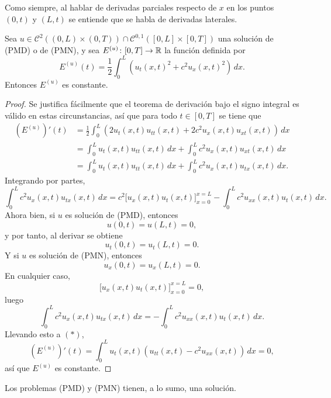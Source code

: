 \documentclass[a4paper, 12pt, extrafontsizes]{memoir}
\begin{document}
Como siempre, al hablar de derivadas parciales respecto de $x$ en los puntos $(0,t)$ y $(L,t)$ se entiende que se habla de derivadas laterales.

\begin{proposition}
    Sea $u \in \mathcal{C}^2((0,L) \times (0,T)) \cap \mathcal{C}^{0,1}([0,L] \times [0,T])$ una solución de \textup{(PMD)} o de \textup{(PMN)}, y sea $E^{(u)} \colon [0,T] \to \mathbb R$ la función definida por
    \[E^{(u)}(t) = \frac{1}{2}\int_0^L(u_t(x,t)^2+c^2u_x(x,t)^2) \, dx.\]
    Entonces $E^{(u)}$ es constante.
\end{proposition}

\begin{proof}
    Se justifica fácilmente que el teorema de derivación bajo el signo integral es válido en estas circunstancias, así que para todo $t \in [0,T]$ se tiene que
    \begin{align*}
        (E^{(u)})'(t) &= \frac{1}{2}\int_0^L(2u_t(x,t)u_{tt}(x,t)+2c^2u_x(x,t)u_{xt}(x,t)) \, dx \\
        &= \int_0^Lu_t(x,t)u_{tt}(x,t)\, dx +\int_0^Lc^2u_x(x,t)u_{xt}(x,t) \, dx \\
        &= \int_0^Lu_t(x,t)u_{tt}(x,t)\, dx +\int_0^Lc^2u_x(x,t)u_{tx}(x,t) \, dx. \tag{$\ast$}
    \end{align*}
    Integrando por partes,
    \[\int_0^L c^2u_x(x,t)u_{tx}(x,t) \, dx = c^2\biggl[u_x(x,t)u_t(x,t)\biggr]_{x=0}^{x=L} -\int_0^Lc^2u_{xx}(x,t)u_t(x,t) \, dx.\]
    Ahora bien, si $u$ es solución de (PMD), entonces
    \[u(0,t) = u(L,t) = 0,\]
    y por tanto, al derivar se obtiene
    \[u_t(0,t) = u_t(L,t) = 0.\]
    Y si $u$ es solución de (PMN), entonces
    \[u_x(0,t) = u_x(L,t) = 0.\]
    En cualquier caso,
    \[\biggl[u_x(x,t)u_t(x,t)\biggr]_{x=0}^{x=L}  = 0,\]
    luego 
    \[\int_0^L c^2u_x(x,t)u_{tx}(x,t) \, dx = -\int_0^Lc^2u_{xx}(x,t)u_t(x,t) \, dx.\]
    Llevando esto a $(\ast)$,
    \[(E^{(u)})'(t) = \int_0^Lu_t(x,t)(u_{tt}(x,t)-c^2u_{xx}(x,t)) \, dx = 0,\]
    así que $E^{(u)}$ es constante.
\end{proof}

\begin{theorem}
    Los problemas \textup{(PMD)} y \textup{(PMN)} tienen, a lo sumo, una solución.
\end{theorem}
\end{document}
